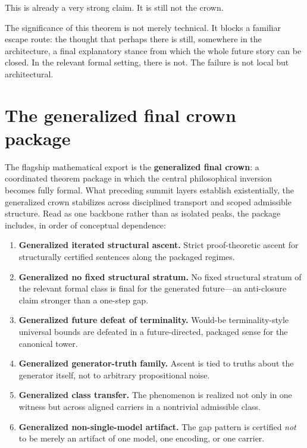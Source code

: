 \documentclass[11pt,a4paper]{article}
\theoremstyle{definition}
\begin{document}
This is already a very strong claim. It is still not the crown.

The significance of this theorem is not merely technical. It blocks a familiar escape route: the thought that perhaps there is still, somewhere in the architecture, a final explanatory stance from which the whole future story can be closed. In the relevant formal setting, there is not. The failure is not local but architectural.

\section{The generalized final crown package}\label{sec:generalized-crown}

The flagship mathematical export is the \textbf{generalized final crown}: a coordinated theorem package in which the central philosophical inversion becomes fully formal. What preceding summit layers establish existentially, the generalized crown stabilizes across disciplined transport and scoped admissible structure. Read as one backbone rather than as isolated peaks, the package includes, in order of conceptual dependence:

\begin{enumerate}[leftmargin=2em]
\item \textbf{Generalized iterated structural ascent.} Strict proof-theoretic ascent for structurally certified sentences along the packaged regimes.
\item \textbf{Generalized no fixed structural stratum.} No fixed structural stratum of the relevant formal class is final for the generated future---an anti-closure claim stronger than a one-step gap.
\item \textbf{Generalized future defeat of terminality.} Would-be terminality-style universal bounds are defeated in a future-directed, packaged sense for the canonical tower.
\item \textbf{Generalized generator-truth family.} Ascent is tied to truths about the generator itself, not to arbitrary propositional noise.
\item \textbf{Generalized class transfer.} The phenomenon is realized not only in one witness but across aligned carriers in a nontrivial admissible class.
\item \textbf{Generalized non-single-model artifact.} The gap pattern is certified \emph{not} to be merely an artifact of one model, one encoding, or one carrier.
\end{enumerate}
\end{document}
